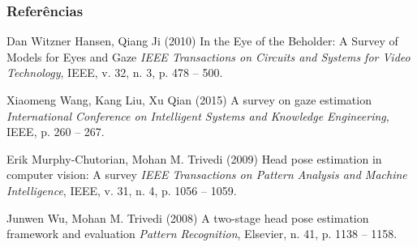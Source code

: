 \begin{frame}
\frametitle{Referências}
\footnotesize{
\begin{thebibliography}{99} %
 Dan Witzner Hansen, Qiang Ji (2010)
\newblock In the Eye of the Beholder: A Survey of Models for Eyes and Gaze
\newblock \emph{IEEE Transactions on Circuits and Systems for Video Technology}, IEEE, v. 32, n. 3, p. 478 -- 500.

 Xiaomeng Wang, Kang Liu, Xu Qian (2015)
\newblock A survey on gaze estimation
\newblock \emph{International Conference on Intelligent Systems and Knowledge Engineering}, IEEE, p. 260 -- 267.

Erik Murphy-Chutorian, Mohan M. Trivedi (2009)
\newblock Head pose estimation in computer vision: A survey
\newblock \emph{IEEE Transactions on Pattern Analysis and Machine Intelligence}, IEEE, v. 31, n. 4, p. 1056 -- 1059.

 Junwen Wu, Mohan M. Trivedi (2008)
\newblock A two-stage head pose estimation framework and evaluation
\newblock \emph{Pattern Recognition}, Elsevier, n. 41, p. 1138 -- 1158.
\end{thebibliography}
}
\end{frame}
 
